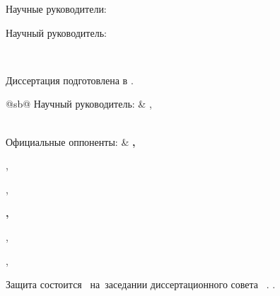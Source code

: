 %
\vspace{0pt plus4fill} %
\begin{flushright}
\ifdefined\supervisorTwoFio
Научные руководители:

\supervisorRegalia

\ifdefined\supervisorDead
\framebox{\supervisorFio}
\else
\supervisorFio
\fi

\supervisorTwoRegalia

\ifdefined\supervisorTwoDead
\framebox{\supervisorTwoFio}
\else
\supervisorTwoFio
\fi
\else
Научный руководитель:

\supervisorRegalia

\ifdefined\supervisorDead
\framebox{\supervisorFio}
\else
\supervisorFio
\fi
\fi

\end{flushright}
%
\vspace{0pt plus4fill} %
{\centering\thesisCity\ \thesisYear\par}

\clearpage

\thispagestyle{empty}
\noindent Диссертация подготовлена в {\thesisInOrganization}.

\vspace{0.008\paperheight plus1fill}
\noindent%
\begin{tabularx}{\textwidth}{@{}sb@{}}
	Научный руководитель:   & \supervisorRegalia,\par
	\textbf{\supervisorFio}
	\vspace{0.013\paperheight}\\

	Официальные оппоненты:  &
		\textbf{\opponentOneFio,}\par
		\opponentOneRegalia,\par
		\opponentOneJobPlace,\par
		\opponentOneJobPost\par
		\vspace{0.01\paperheight}
		\textbf{\opponentTwoFio,}\par
		\opponentTwoRegalia,\par
		\opponentTwoJobPlace,\par
		\opponentTwoJobPost
\end{tabularx}

\vspace{0.008\paperheight plus1fill}
\noindent Защита состоится ~на~заседании диссертационного совета \ . .

